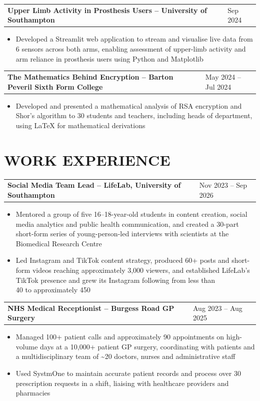 \documentclass[9.5pt,a4paper]{article}
\makeatletter
\newcommand{\entry}[2]{%
  \vspace{2.5pt}%
  \begin{tabularx}{\textwidth}{@{}X>{\raggedleft\arraybackslash}p{3.45cm}@{}}
    \textbf{#1} & #2
  \end{tabularx}
}
\newcommand{\bulletitem}[1]{
  \item #1
}
\makeatother
\begin{document}
\entry{Upper Limb Activity in Prosthesis Users -- University of Southampton}{Sep 2024}
\begin{itemize}
    \bulletitem{Developed a Streamlit web application to stream and visualise live data from 6 sensors across both arms, enabling assessment of upper-limb activity and arm reliance in prosthesis users using Python and Matplotlib}
\end{itemize}

\entry{The Mathematics Behind Encryption -- Barton Peveril Sixth Form College}{May 2024 -- Jul 2024}
\begin{itemize}
    \bulletitem{Developed and presented a mathematical analysis of RSA encryption and Shor's algorithm to 30 students and teachers, including heads of department, using LaTeX for mathematical derivations}
\end{itemize}

\section*{WORK EXPERIENCE}

\entry{Social Media Team Lead -- LifeLab, University of Southampton}{Nov 2023 -- Sep 2026}
\begin{itemize}
    \bulletitem{Mentored a group of five 16--18-year-old students in content creation, social media analytics and public health communication, and created a 30-part short-form series of young-person-led interviews with scientists at the\\
    Biomedical Research Centre}
    \bulletitem{Led Instagram and TikTok content strategy, produced 60+ posts and short-form videos reaching approximately 3,000 viewers, and established LifeLab's TikTok presence and grew its Instagram following from less than\\
    40 to approximately 450}
\end{itemize}

\entry{NHS Medical Receptionist -- Burgess Road GP Surgery}{Aug 2023 -- Aug 2025}
\begin{itemize}
    \bulletitem{Managed 100+ patient calls and approximately 90 appointments on high-volume days at a 10,000+ patient GP surgery, coordinating with patients and a multidisciplinary team of \textasciitilde20 doctors, nurses and administrative staff}
    \bulletitem{Used SystmOne to maintain accurate patient records and process over 30 prescription requests in a shift, liaising with healthcare providers and pharmacies}
\end{itemize}
\end{document}
